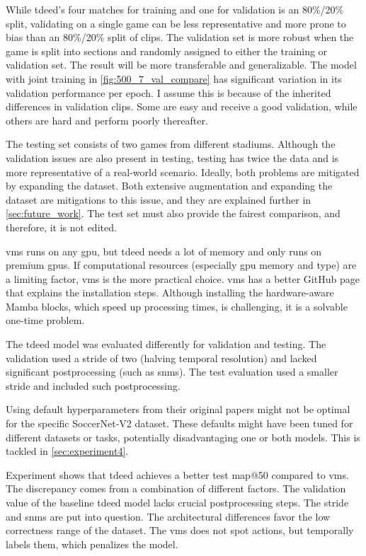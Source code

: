 While \acrshort{tdeed}'s four matches for training and one for validation is an 80\%/20\% split, validating on a single game can be less representative and more prone to bias than an 80\%/20\% split of clips. The validation set is more robust when the game is split into sections and randomly assigned to either the training or validation set. The result will be more transferable and generalizable. The model with joint training in \cref{fig:500_7_val_compare} has significant variation in its validation performance per epoch. I assume this is because of the inherited differences in validation clips. Some are easy and receive a good validation, while others are hard and perform poorly thereafter. 

The testing set consists of two games from different stadiums. Although the validation issues are also present in testing, testing has twice the data and is more representative of a real-world scenario. Ideally, both problems are mitigated by expanding the dataset. Both extensive augmentation and expanding the dataset are mitigations to this issue, and they are explained further in \cref{sec:future_work}. The test set must also provide the fairest comparison, and therefore, it is not edited. 

\acrshort{vms} runs on any \acrshort{gpu}, but \acrshort{tdeed} needs a lot of memory and only runs on premium \acrshort{gpu}s. If computational resources (especially \acrshort{gpu} memory and type) are a limiting factor, \acrshort{vms} is the more practical choice. \acrshort{vms} has a better GitHub page that explains the installation steps. Although installing the hardware-aware Mamba blocks, which speed up processing times, is challenging, it is a solvable one-time problem.


The \acrshort{tdeed} model was evaluated differently for validation and testing. The validation used a stride of two (halving temporal resolution) and lacked significant postprocessing (such as \acrshort{snms}). The test evaluation used a smaller stride and included such postprocessing. 


Using default hyperparameters from their original papers might not be optimal for the specific SoccerNet-V2 dataset. These defaults might have been tuned for different datasets or tasks, potentially disadvantaging one or both models. This is tackled in \autoref{sec:experiment4}.


Experiment shows that \acrshort{tdeed} achieves a better test \acrshort{map}@50 compared to \acrshort{vms}. The discrepancy comes from a combination of different factors. The validation value of the baseline \acrshort{tdeed} model lacks crucial postprocessing steps. The stride and \acrfull{snms} are put into question. The architectural differences favor the low correctness range of the dataset. The \acrshort{vms} does not spot actions, but temporally labels them, which penalizes the model. 

